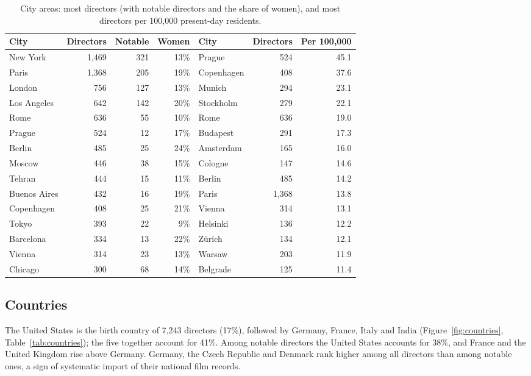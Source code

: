 \documentclass[11pt,a4paper]{article}
\begin{document}
\begin{table}[tbp]\centering\small\caption{City areas: most directors (with notable directors and the share of women), and most directors per 100,000 present-day residents.}\label{tab:cities}\setlength{\tabcolsep}{5pt}\begin{tabular}{lrrr@{\hspace{18pt}}lrr}\toprule City & Directors & Notable & Women & City & Directors & Per 100,000\\\midrule
New York & 1,469 & 321 & 13\% & Prague & 524 & 45.1\\
Paris & 1,368 & 205 & 19\% & Copenhagen & 408 & 37.6\\
London & 756 & 127 & 13\% & Munich & 294 & 23.1\\
Los Angeles & 642 & 142 & 20\% & Stockholm & 279 & 22.1\\
Rome & 636 & 55 & 10\% & Rome & 636 & 19.0\\
Prague & 524 & 12 & 17\% & Budapest & 291 & 17.3\\
Berlin & 485 & 25 & 24\% & Amsterdam & 165 & 16.0\\
Moscow & 446 & 38 & 15\% & Cologne & 147 & 14.6\\
Tehran & 444 & 15 & 11\% & Berlin & 485 & 14.2\\
Buenos Aires & 432 & 16 & 19\% & Paris & 1,368 & 13.8\\
Copenhagen & 408 & 25 & 21\% & Vienna & 314 & 13.1\\
Tokyo & 393 & 22 & 9\% & Helsinki & 136 & 12.2\\
Barcelona & 334 & 13 & 22\% & Zürich & 134 & 12.1\\
Vienna & 314 & 23 & 13\% & Warsaw & 203 & 11.9\\
Chicago & 300 & 68 & 14\% & Belgrade & 125 & 11.4\\
\bottomrule\end{tabular}\end{table}

\subsection{Countries}
The United States is the birth country of 7,243 directors (17\%), followed by Germany, France, Italy and India (Figure~\ref{fig:countries}, Table~\ref{tab:countries}); the five together account for 41\%. Among notable directors the United States accounts for 38\%, and France and the United Kingdom rise above Germany. Germany, the Czech Republic and Denmark rank higher among all directors than among notable ones, a sign of systematic import of their national film records.
\end{document}
